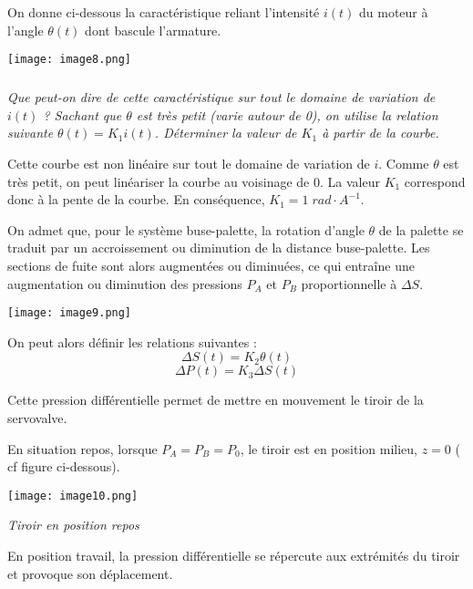 \begin{multicols}{2}
On donne ci-dessous la caractéristique reliant l'intensité $i(t)$ du moteur à l'angle $\theta(t)$ dont bascule l'armature.

\begin{center}
\texttt{[image: image8.png]}
\end{center}

\fi



\subparagraph{}
\textit{Que peut-on dire de cette caractéristique sur tout le domaine de variation de $i(t)$ ? Sachant que $\theta$ est très petit (varie autour de 0), on utilise la relation suivante $\theta(t)=K_1i(t)$.  Déterminer la valeur de $K_1$ à partir de la courbe.}

\ifprof
\begin{corrige}
Cette courbe est non linéaire sur tout le domaine de variation de $i$. Comme
$\theta$ est très petit, on peut linéariser la courbe au voisinage de 0. La
valeur $K_1$ correspond donc à la pente  de la courbe. En conséquence,
$K_1=1\;rad\cdot A^{-1}$. 
\end{corrige}
\else 


On admet que, pour le système buse-palette, la rotation d'angle $\theta$ de la palette se traduit par un
accroissement ou diminution de la distance buse-palette. Les sections de fuite sont alors augmentées ou
diminuées, ce qui entraîne une augmentation ou diminution des pressions $P_A$ et $P_B$ proportionnelle à
$\Delta S$.

\begin{center}
\texttt{[image: image9.png]}
\end{center}

On peut alors définir les relations suivantes :
$$\Delta S (t)=K_2 \theta (t) $$
$$\Delta P (t)=K_3 \Delta  S(t)$$

Cette pression différentielle permet de mettre en mouvement le tiroir de la servovalve.

En situation repos, lorsque $P_A=P_B=P_0$, le tiroir est en position milieu, $z = 0$ ( cf figure ci-dessous).

\begin{center}
\texttt{[image: image10.png]}

\textit{Tiroir en position repos}
\end{center}


En position travail, la pression différentielle se répercute aux extrémités du tiroir et provoque son
déplacement.


\end{multicols}
